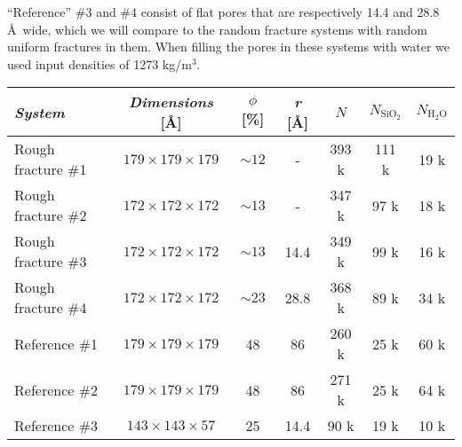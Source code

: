 ``Reference'' \#3 and \#4 consist of flat pores that are respectively 14.4 and 28.8 \AA\ wide, which we will compare to the random fracture systems with random uniform fractures in them. When filling the pores in these systems with water we used input densities of 1273 kg/m$^3$. %
%
\begin{table}[htpb]
\centering
    \begin{tabular}{l|cccccc}
    \textit{System}             & \textit{Dimensions} [\AA]     & $\phi$ [\%]   & \textit{r} [\AA]  & $N$       & $N_\text{SiO$_2$}$    & $N_\text{H$_2$O}$ \\ \hline 
    Rough fracture \#1          & $179 \times 179 \times 179$   & ${\sim}12$    & -                 & 393 k  & 111 k                    & 19 k           \\ %
    Rough fracture \#2          & $172 \times 172 \times 172$   & ${\sim}13$    & -                 & 347 k  & 97 k                     & 18 k            \\ %
    Rough fracture \#3          & $172 \times 172 \times 172$   & ${\sim}13$    & 14.4              & 349 k  & 99 k                     & 16 k            \\ %
    Rough fracture \#4          & $172 \times 172 \times 172$   & ${\sim}23$    & 28.8              & 368 k  & 89 k                     & 34 k            \\ %
    \hline %
    Reference \#1           & $179 \times 179 \times 179$   & 48            & 86                & 260 k     & 25 k                  & 60 k                             \\ %
    Reference \#2           & $179 \times 179 \times 179$   & 48            & 86                & 271 k     & 25 k                  & 64 k                             \\ %
    Reference \#3           & $143 \times 143 \times 57$    & 25            & 14.4              & 90 k      & 19 k                  & 10 k                             \\ %

\end{tabular}
\end{table}
